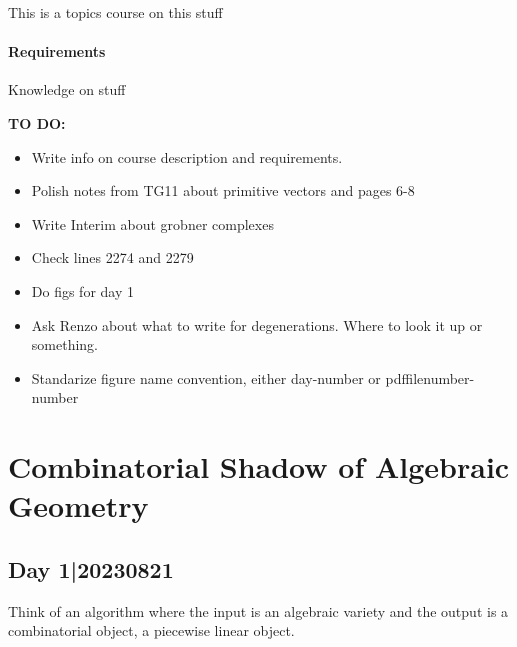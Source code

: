 \documentclass[12pt]{memoir}
\begin{document}
\maketitle
{\small 
\setlength{\parindent}{0em}
\setlength{\parskip}{1em}

This is a topics course on this stuff

\subsubsection*{Requirements}
Knowledge on stuff\par 

\textbf{TO DO:}
\begin{itemize}
    \item Write info on course description and requirements.
    \item Polish notes from TG11 about primitive vectors and pages 6-8
    \item Write Interim about grobner complexes
    \item Check lines 2274 and 2279
    \item Do figs for day 1
    \item Ask Renzo about what to write for degenerations. Where to look it up or something.
    \item Standarize figure name convention, either day-number or pdffilenumber-number
\end{itemize}
}
\newpage
\tableofcontents
\chapter{Combinatorial Shadow of Algebraic Geometry}

\section{Day 1|20230821}

Think of an algorithm where the input is an algebraic variety and the output is a combinatorial object, a piecewise linear object.
\end{document}
